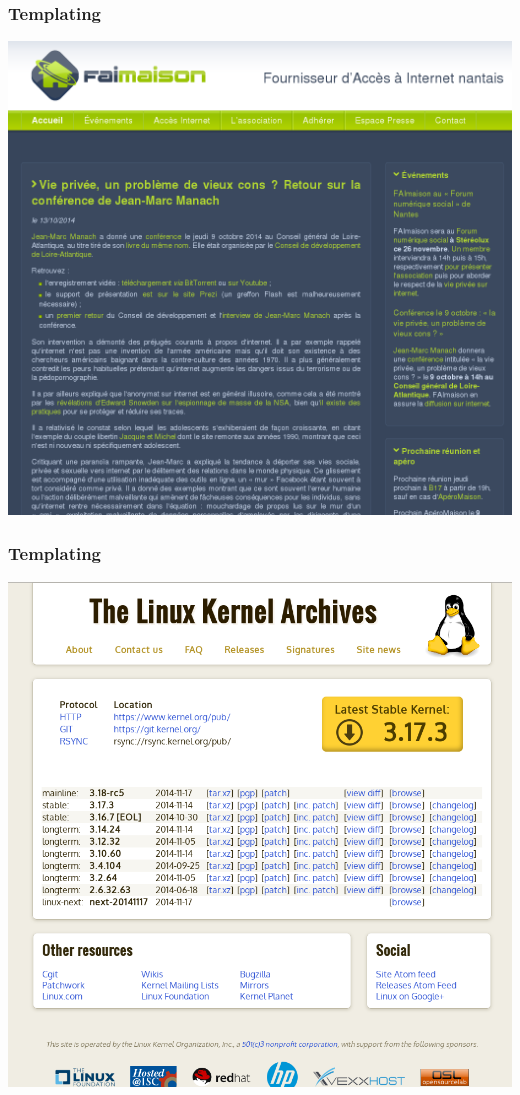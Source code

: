 \documentclass[frenchb,francais]{beamer}
\begin{document}
\begin{frame}
    \frametitle{Templating}
    \begin{center}\includegraphics[scale=.20]{img/faimaison_net.png}\end{center}
\end{frame}

\begin{frame}
    \frametitle{Templating}
    \begin{center}\includegraphics[scale=.20]{img/kernel_org.png}\end{center}
\end{frame}
\end{document}

